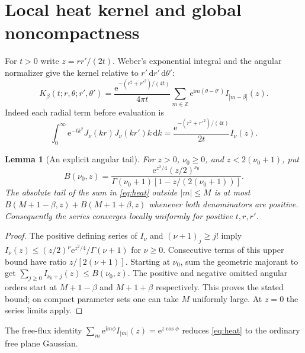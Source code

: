 \documentclass[10pt]{article}
\newcommand{\dd}{\,\mathrm d}
\newcommand{\e}{\mathrm e}
\newcommand{\ii}{\mathrm i}
\newtheorem{lemma}{Lemma}
\begin{document}
\section{Local heat kernel and global noncompactness}
For $t>0$ write $z=rr'/(2t)$. Weber's exponential integral \cite[10.22.67]{DLMF}
and the angular normalizer give the kernel relative to $r'\dd r'\dd\theta'$:
\begin{equation}
K_\beta(t;r,\theta;r',\theta')=
\frac{\e^{-(r^2+r'^2)/(4t)}}{4\pi t}
\sum_{m\in\mathbb Z}\e^{\ii m(\theta-\theta')}I_{|m-\beta|}(z).
\label{eq:heat}
\end{equation}
Indeed each radial term before evaluation is
\begin{equation}
\int_0^\infty\e^{-tk^2}J_\nu(kr)J_\nu(kr')k\dd k
=\frac{\e^{-(r^2+r'^2)/(4t)}}{2t}I_\nu(z).
\label{eq:weber}
\end{equation}

\begin{lemma}[An explicit angular tail]
For $z>0$, $\nu_0\ge0$, and $z<2(\nu_0+1)$, put
\begin{equation}
B(\nu_0,z)=\frac{\e^{z^2/4}(z/2)^{\nu_0}}
{\Gamma(\nu_0+1)[1-z/(2(\nu_0+1))]}.
\label{eq:tailbound}
\end{equation}
The absolute tail of the sum in \eqref{eq:heat} outside $|m|\le M$ is at most
$B(M+1-\beta,z)+B(M+1+\beta,z)$ whenever both denominators are positive.
Consequently the series converges locally uniformly for positive $t,r,r'$.
\end{lemma}
\begin{proof}
The positive defining series of $I_\nu$ and $(\nu+1)_j\ge j!$ imply
$I_\nu(z)\le (z/2)^\nu\e^{z^2/4}/\Gamma(\nu+1)$ for $\nu\ge0$.
Consecutive terms of this upper bound have ratio $z/[2(\nu+1)]$.
Starting at $\nu_0$, sum the geometric majorant to get
$\sum_{j\ge0}I_{\nu_0+j}(z)\le B(\nu_0,z)$.
The positive and negative omitted angular orders start at $M+1-\beta$ and
$M+1+\beta$ respectively. This proves the stated bound; on compact parameter
sets one can take $M$ uniformly large. At $z=0$ the series limits apply.
\end{proof}
The free-flux identity $\sum_m\e^{\ii m\phi}I_{|m|}(z)=\e^{z\cos\phi}$
reduces \eqref{eq:heat} to the ordinary free plane Gaussian.
\end{document}
